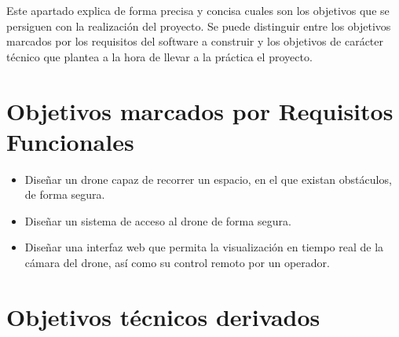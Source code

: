 
Este apartado explica de forma precisa y concisa cuales son los objetivos que se persiguen con la realización del proyecto. Se puede distinguir entre los objetivos marcados por los requisitos del software a construir y los objetivos de carácter técnico que plantea a la hora de llevar a la práctica el proyecto.

\section{Objetivos marcados por Requisitos Funcionales}

\begin{itemize}
\item Diseñar un drone capaz de recorrer un espacio, en el que existan obstáculos, de forma segura.
\item Diseñar un sistema de acceso al drone de forma segura. 
\item Diseñar una interfaz web que permita la visualización en tiempo real de la cámara del drone, así como su control remoto por un operador.
\end{itemize}


\section{Objetivos técnicos derivados}

